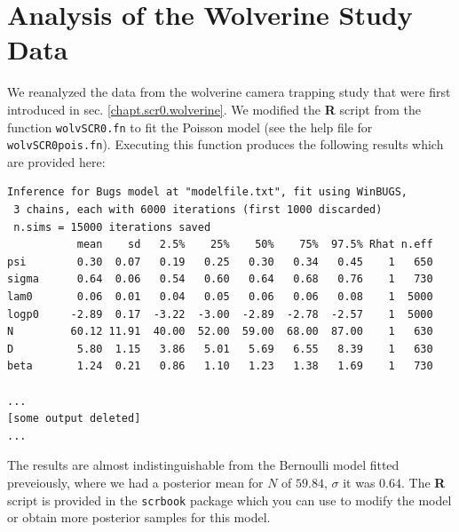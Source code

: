\section{Analysis of the Wolverine Study Data}

We reanalyzed the data from
the  wolverine camera trapping study that were first introduced in 
sec. \ref{chapt.scr0.wolverine}.
We modified the {\bf R} script from the function \mbox{\tt wolvSCR0.fn} to fit the
Poisson model (see the help file for \mbox{\tt
  wolvSCR0pois.fn}). Executing this function produces the following
results which are provided here:
{\small
\begin{verbatim}
Inference for Bugs model at "modelfile.txt", fit using WinBUGS,
 3 chains, each with 6000 iterations (first 1000 discarded)
 n.sims = 15000 iterations saved
           mean    sd   2.5%    25%    50%    75%  97.5% Rhat n.eff
psi        0.30  0.07   0.19   0.25   0.30   0.34   0.45    1   650
sigma      0.64  0.06   0.54   0.60   0.64   0.68   0.76    1   730
lam0       0.06  0.01   0.04   0.05   0.06   0.06   0.08    1  5000
logp0     -2.89  0.17  -3.22  -3.00  -2.89  -2.78  -2.57    1  5000
N         60.12 11.91  40.00  52.00  59.00  68.00  87.00    1   630
D          5.80  1.15   3.86   5.01   5.69   6.55   8.39    1   630
beta       1.24  0.21   0.86   1.10   1.23   1.38   1.69    1   730

...
[some output deleted]
...
\end{verbatim}
}
The results are almost indistinguishable from the Bernoulli model
fitted preveiously, where we had a posterior mean for $N$ of
 $59.84$,  $\sigma$ it was
$0.64$. The {\bf R} 
script is provided in the  \mbox{\tt scrbook} package which you can
use to modify the model or obtain more posterior samples for this model.


